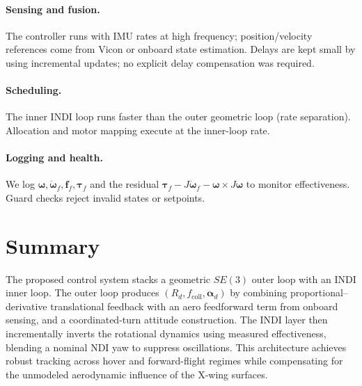 \paragraph{Sensing and fusion.}
The controller runs with IMU rates at high frequency; position/velocity references come from Vicon or onboard state estimation.
Delays are kept small by using incremental updates; no explicit delay compensation was required.

\paragraph{Scheduling.}
The inner INDI loop runs faster than the outer geometric loop (rate separation).
Allocation and motor mapping execute at the inner-loop rate.

\paragraph{Logging and health.}
We log $\boldsymbol{\omega},\dot{\boldsymbol{\omega}}_f,\mathbf{f}_f,\boldsymbol{\tau}_f$ and the residual
$\boldsymbol{\tau}_f - J\dot{\boldsymbol{\omega}}_f - \boldsymbol{\omega}\times J\boldsymbol{\omega}$ to monitor effectiveness.
Guard checks reject invalid states or setpoints.

\section{Summary}\label{sec:ctrl-summary}
The proposed control system stacks a geometric $SE(3)$ outer loop with an INDI inner loop.
The outer loop produces $(R_d,f_{\text{coll}},\boldsymbol{\alpha}_d)$ by combining
proportional–derivative translational feedback with an aero feedforward term from onboard sensing,
and a coordinated-turn attitude construction.
The INDI layer then incrementally inverts the rotational dynamics using measured effectiveness,
blending a nominal NDI yaw to suppress oscillations.
This architecture achieves robust tracking across hover and forward-flight regimes while compensating
for the unmodeled aerodynamic influence of the X-wing surfaces.


